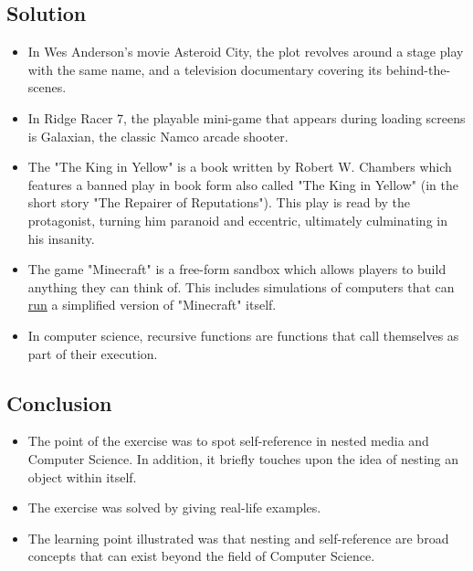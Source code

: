 \documentclass[12pt]{article}
\begin{document}

\subsection{Solution}

\begin{itemize}
\item In Wes Anderson's movie Asteroid City, the plot revolves around a stage play with the same name, and a television documentary covering its behind-the-scenes.
\item In Ridge Racer 7, the playable mini-game that appears during loading
  screens is Galaxian, the classic Namco arcade shooter.
\item The "The King in Yellow" is a book written by Robert W. Chambers which
  features a banned play in book form also called "The King in Yellow" (in the short story "The Repairer of Reputations").
  This play is read by the protagonist, turning him paranoid and eccentric, ultimately culminating in his insanity.
\item The game "Minecraft" is a free-form sandbox which allows players to build anything they can think of. This includes
  simulations of computers that can \href{https://www.youtube.com/watch?v=-BP7DhHTU-I)}{run} a simplified version of "Minecraft" itself.
\item In computer science, recursive functions are functions that call
  themselves as part of their execution.
\end{itemize}


\subsection{Conclusion}

\begin{itemize}

\item
  The point of the exercise was to spot self-reference in nested media and Computer Science. In addition, it briefly touches upon the idea of
  nesting an object within itself.

\item
  The exercise was solved by giving real-life examples.

\item
  The learning point illustrated was that nesting and self-reference are broad concepts that can exist beyond the field of Computer Science.

\end{itemize}
\end{document}
